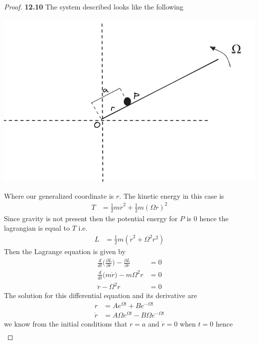 \documentclass[11pt]{article}
\theoremstyle{definition}
\begin{document}
\cleardoublepage
\begin{proof}{\textbf{12.10}}
    The system described looks like the following
    \begin{center}
        \includegraphics[scale=0.4]{ch12-10.png}
    \end{center}
    Where our generalized coordinate is $r$. The kinetic energy in this case is
    \begin{align*}
        T &= \frac{1}{2}m \dot{r}^2 + \frac{1}{2}m (\Omega r)^2
    \end{align*}
    Since gravity is not present then the potential energy for $P$ is $0$ hence
    the lagrangian is equal to $T$ i.e.
    \begin{align*}
        L &= \frac{1}{2}m (\dot{r}^2 + \Omega^2 r^2)
    \end{align*}
    Then the Lagrange equation is given by
    \begin{align*}
        \frac{d}{dt}\bigg(\frac{\partial L}{\partial \dot{r}}\bigg) - \frac{\partial L}{\partial r} &= 0\\
        \frac{d}{dt}\bigg(m\dot{r}\bigg) - m\Omega^2 r &= 0\\
        \ddot{r} - \Omega^2 r &= 0
    \end{align*}
    The solution for this differential equation and its derivative are
    \begin{align*}
        r &= A e^{\Omega t} + B e^{-\Omega t}\\
        \dot{r} &= A\Omega e^{\Omega t} - B\Omega e^{-\Omega t}
    \end{align*}
    we know from the initial conditions that $r = a$ and $\dot{r} = 0$ when
    $t = 0$ hence
    \begin{align*}

\end{align*}
\end{proof}
\end{document}
